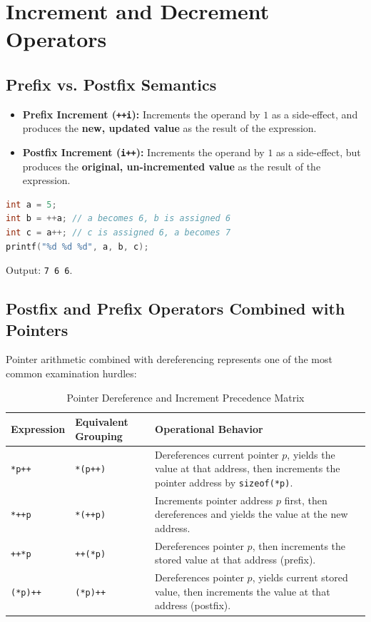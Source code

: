\section{Increment and Decrement Operators}
\label{sec:increment_decrement_operators}

\subsection{Prefix vs. Postfix Semantics}
\begin{itemize}[leftmargin=*]
    \item \textbf{Prefix Increment (\texttt{++i}):} Increments the operand by $1$ as a side-effect, and produces the \textbf{new, updated value} as the result of the expression.
    \item \textbf{Postfix Increment (\texttt{i++}):} Increments the operand by $1$ as a side-effect, but produces the \textbf{original, un-incremented value} as the result of the expression.
\end{itemize}

\begin{lstlisting}[language=C]
int a = 5;
int b = ++a; // a becomes 6, b is assigned 6
int c = a++; // c is assigned 6, a becomes 7
printf("%d %d %d", a, b, c);
\end{lstlisting}
Output: \texttt{7 6 6}.

\subsection{Postfix and Prefix Operators Combined with Pointers}
Pointer arithmetic combined with dereferencing represents one of the most common examination hurdles:
\begin{table}[htbp]
\centering
\small
\begin{tabularx}{\textwidth}{l X X}
\toprule
\textbf{Expression} & \textbf{Equivalent Grouping} & \textbf{Operational Behavior} \\
\midrule
\texttt{*p++} & \texttt{*(p++)} & Dereferences current pointer $p$, yields the value at that address, then increments the pointer address by \texttt{sizeof(*p)}. \\
\texttt{*++p} & \texttt{*(++p)} & Increments pointer address $p$ first, then dereferences and yields the value at the new address. \\
\texttt{++*p} & \texttt{++(*p)} & Dereferences pointer $p$, then increments the stored value at that address (prefix). \\
\texttt{(*p)++} & \texttt{(*p)++} & Dereferences pointer $p$, yields current stored value, then increments the value at that address (postfix). \\
\bottomrule
\end{tabularx}
\caption{Pointer Dereference and Increment Precedence Matrix}
\label{tab:pointer_increment_matrix}
\end{table}


